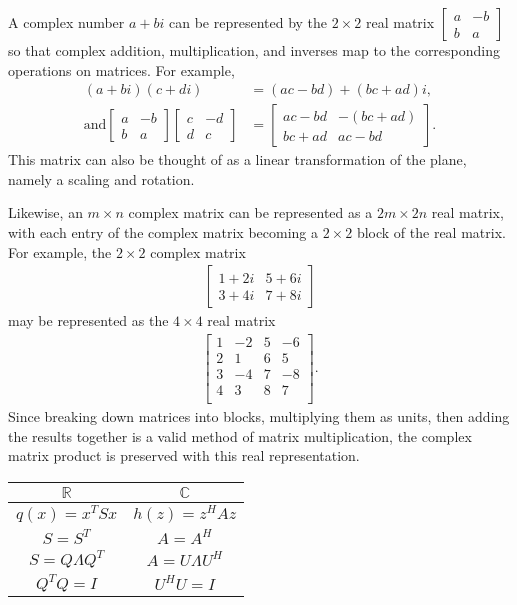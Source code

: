 \documentclass{article}
\begin{document}
A complex number $a+bi$ can be represented by the $2 \times 2$ real matrix
$\begin{bmatrix} a & -b \\ b & a \end{bmatrix}$
so that complex addition, multiplication, and inverses
map to the corresponding operations on matrices.
For example,
\begin{align*}
  (a+bi) (c+di) &= (ac-bd)+(bc+ad)i, \\
  \text{and} \begin{bmatrix} a & -b \\ b & a \end{bmatrix}
  \begin{bmatrix} c & -d \\ d & c \end{bmatrix} &=
  \begin{bmatrix} ac-bd & -(bc+ad) \\ bc+ad & ac-bd \end{bmatrix}.
\end{align*}
This matrix can also be thought of as a linear transformation of the plane,
namely a scaling and rotation.

Likewise, an $m \times n$ complex matrix can be represented as a $2m \times 2n$ real matrix,
with each entry of the complex matrix becoming a $2 \times 2$ block of the real matrix.
For example, the $2 \times 2$ complex matrix
\begin{align*}
  \begin{bmatrix} 1+2i & 5+6i \\ 3+4i & 7+8i \end{bmatrix}
\end{align*}
may be represented as the $4 \times 4$ real matrix
\begin{align*}
  \begin{bmatrix}
    1 & -2 & 5 & -6 \\
    2 & 1 & 6 & 5 \\
    3 & -4 & 7 & -8 \\
    4 & 3 & 8 & 7 \\
  \end{bmatrix}.
\end{align*}
Since breaking down matrices into blocks, multiplying them as units,
then adding the results together is a valid method of matrix multiplication,
the complex matrix product is preserved with this real representation.

\begin{center}
  \begin{tabular}{|c|c|}
    \hline
    $\mathbb{R}$ & $\mathbb{C}$ \\ \hline
    $q(x) = x^TSx$ & $h(z) = z^HAz$ \\ \hline
    $S = S^T$ & $A = A^H$ \\ \hline
    $S = Q \Lambda Q^T$ & $A = U \Lambda U^H$ \\ \hline
    $Q^TQ = I$ & $U^HU = I$ \\ \hline
  \end{tabular}
\end{center}
\end{document}
